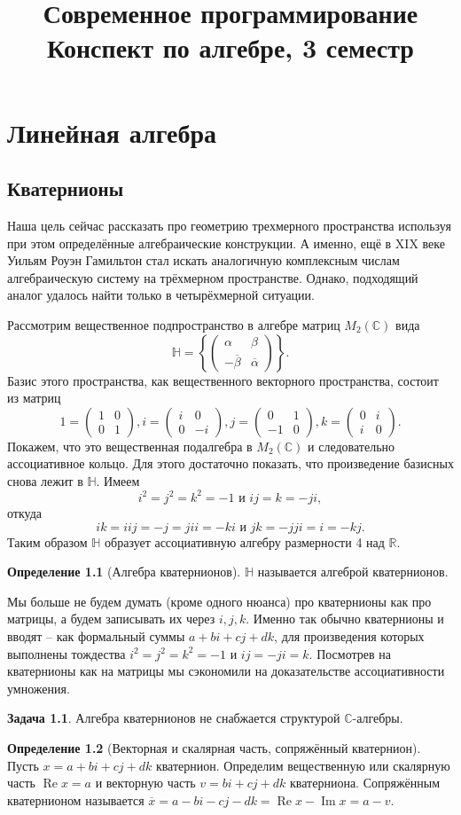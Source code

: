\documentclass[10pt,a4paper,oneside]{book}
\title{Современное программирование \\ 
Конспект по алгебре, 3 семестр}
\date{}
\theoremstyle{definition}
\newtheorem{zad}{\color{violet!100!black}Задача}
\newtheorem*{defn}{\color{yellow!30!red} Определение}
\renewcommand{\Re}{\operatorname{Re}}
\newcommand{\mb}[1]{\mathbb{#1}}
\newcommand{\ovl}{\overline}
\renewcommand{\Im}{\operatorname{Im}}
\def\dfn{\begin{defn}}
\def\edfn{\end{defn}}
\def\zd{\begin{zad}}
\def\ezd{\end{zad}}
\def\pmat{\begin{pmatrix}}
\def\epmat{\end{pmatrix}}
\begin{document}
\tableofcontents

\chapter{Линейная алгебра}

\section{Кватернионы}


Наша цель сейчас рассказать про геометрию трехмерного пространства используя при этом определённые алгебраические конструкции. А именно, ещё в XIX веке Уильям Роуэн Гамильтон стал искать аналогичную комплексным числам алгебраическую систему на трёхмерном пространстве.  
Однако, подходящий аналог удалось найти только в четырёхмерной ситуации.


Рассмотрим вещественное подпространство в алгебре матриц $M_2(\mb C)$ вида
$$\mb H = \left\{\pmat \alpha & \beta \\ -\ovl{\beta} & \ovl{\alpha} \epmat \right\}.$$
Базис этого пространства, как вещественного векторного пространства, состоит из матриц 
$$ 1=\pmat 1 & 0 \\ 0& 1 \epmat, i= \pmat i & 0 \\ 0& -i \epmat, j=\pmat 0& 1 \\ -1 & 0 \epmat, k=\pmat 0 & i \\ i & 0\epmat. $$ 
Покажем, что это вещественная подалгебра в $M_2(\mb C)$ и следовательно ассоциативное кольцо. 
Для этого достаточно показать, что произведение базисных снова лежит в $\mb H$. Имеем $$i^2=j^2=k^2=-1 \text{ и } ij=k=-ji,$$ откуда $$ik= iij=-j=jii=-ki \text{ и } jk=-jji=i=-kj.$$ Таким образом $\mb H$ образует ассоциативную алгебру размерности 4 над $\mb R$.
 
\dfn[Алгебра кватернионов] $\mb H$ называется алгеброй кватернионов. 
\edfn
Мы больше не будем думать (кроме одного нюанса) про кватернионы как про матрицы, а будем записывать их через $i,j,k$. Именно так обычно кватернионы и вводят -- как формальный суммы $a+bi+cj+dk$, для произведения которых выполнены тождества $i^2=j^2=k^2=-1$ и $ij=-ji=k$. Посмотрев на кватернионы как на матрицы мы сэкономили на доказательстве ассоциативности умножения.

\zd Алгебра кватернионов не снабжается структурой $\mb C$-алгебры.
\ezd






\dfn[Векторная и скалярная часть, сопряжённый кватернион] Пусть $x= a+bi+cj+dk$ кватернион. Определим вещественную или скалярную часть $\Re x=a$ и векторную часть $v= bi+cj+dk$ кватерниона. Сопряжённым кватернионом называется $\ovl{x}= a-bi-cj-dk= \Re x - \Im x =a-v$. 
\edfn
\end{document}
